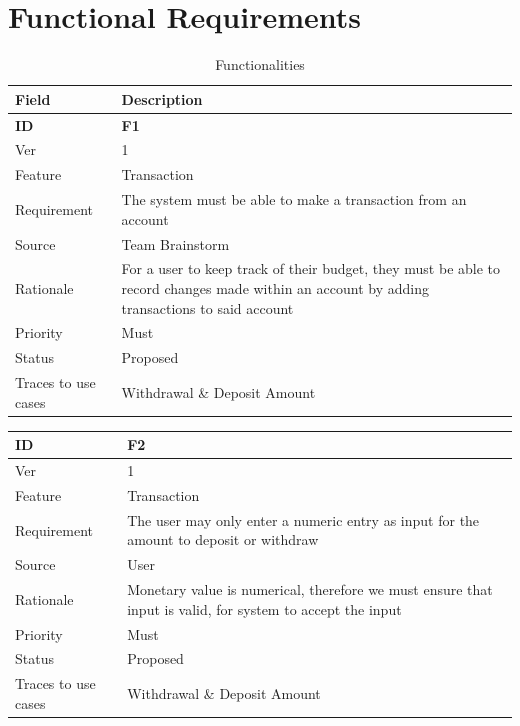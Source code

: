 \documentclass[12pt]{article}
\begin{document}
\section{Functional Requirements}
\begin{table}[H]
\caption{Functionalities}
  \begin{center}
    \begin{tabular}{|l|p{10cm}|}
      \hline
      Field & Description\\
      \hline\hline
      \bf ID & \bf {F1}\\
      \hline
      Ver & 1\\
      \hline
      Feature & Transaction\\
      \hline
      Requirement & The system must be able to make a transaction from an account\\
      \hline
      Source & Team Brainstorm\\
      \hline
      Rationale & For a user to keep track of their budget, they must be able to record changes made within an account by adding transactions to said account\\
      \hline
      Priority & Must\\
      \hline
      Status & Proposed\\
      \hline
      Traces to use cases & Withdrawal \& Deposit Amount\\
      \hline
    \end{tabular}
  \end{center}
\end{table}
\begin{table}
  \begin{center}
    \begin{tabular}{|l|p{10cm}|}
      \hline
      \bf ID & \bf {F2}\\
      \hline
      Ver & 1\\
      \hline
      Feature & Transaction\\
      \hline
      Requirement & The user may only enter a numeric entry as input for the amount to deposit or withdraw\\
      \hline
      Source & User\\
      \hline
      Rationale & Monetary value is numerical, therefore we must ensure that input is valid, for system to accept the input\\
      \hline
      Priority & Must\\
      \hline
      Status & Proposed\\
      \hline
      Traces to use cases & Withdrawal \& Deposit Amount\\
      \hline
    \end{tabular}
  \end{center}
\end{table}
\end{document}
